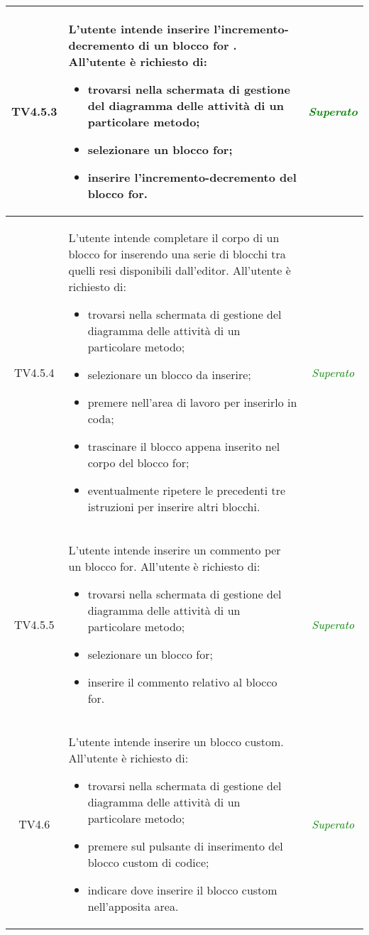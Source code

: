 \begin{longtable}{|c|>{}m{8cm}|c|}
\hypertarget{TV4.5.3}{TV4.5.3} & L'utente intende inserire l'incremento-decremento di un blocco for .
All'utente è richiesto di:
\begin{itemize}
	\item trovarsi nella schermata di gestione del diagramma delle attività di un particolare metodo;
	\item selezionare un blocco for;
	\item inserire l'incremento-decremento del blocco for.
\end{itemize} & \textcolor{Green}{\textit{Superato}}\\ \hline

\hypertarget{TV4.5.4}{TV4.5.4} & L'utente intende completare il corpo di un blocco for inserendo una serie di blocchi tra quelli resi disponibili dall'editor.
All'utente è richiesto di:
\begin{itemize}
	\item trovarsi nella schermata di gestione del diagramma delle attività di un particolare metodo;
	\item selezionare un blocco da inserire;
	\item premere nell'area di lavoro per inserirlo in coda;
	\item trascinare il blocco appena inserito nel corpo del blocco for;
	\item eventualmente ripetere le precedenti tre istruzioni per inserire altri blocchi.
\end{itemize} & \textcolor{Green}{\textit{Superato}}\\ \hline

\hypertarget{TV4.5.5}{TV4.5.5} & L'utente intende inserire un commento per un blocco for.
All'utente è richiesto di:
\begin{itemize}
	\item trovarsi nella schermata di gestione del diagramma delle attività di un particolare metodo;
	\item selezionare un blocco for;
	\item inserire il commento relativo al blocco for.
\end{itemize} & \textcolor{Green}{\textit{Superato}}\\ \hline

\hypertarget{TV4.6}{TV4.6} & L'utente intende inserire un blocco custom.
All'utente è richiesto di:
\begin{itemize}
	\item trovarsi nella schermata di gestione del diagramma delle attività di un particolare metodo;
	\item premere sul pulsante di inserimento del blocco custom di codice;
	\item indicare dove inserire il blocco custom nell'apposita area.
\end{itemize} & \textcolor{Green}{\textit{Superato}}\\ \hline


\end{longtable}

